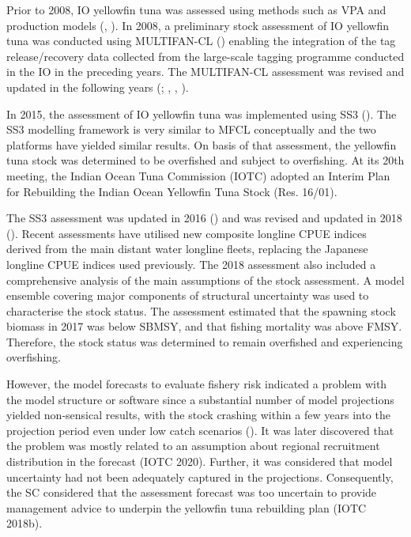 \documentclass[
]{scrartcl}
\begin{document}
Prior to 2008, IO yellowfin tuna was assessed using methods such as VPA
and production models
(, ). In
2008, a preliminary stock assessment of IO yellowfin tuna was conducted
using MULTIFAN-CL
() enabling the integration of the tag release/recovery data
collected from the large-scale tagging programme conducted in the IO in
the preceding years. The MULTIFAN-CL assessment was revised and updated
in the following years
(; ,
,
).

In 2015, the assessment of IO yellowfin tuna was implemented using SS3
(). The
SS3 modelling framework is very similar to MFCL conceptually and the two
platforms have yielded similar results. On basis of that assessment, the
yellowfin tuna stock was determined to be overfished and subject to
overfishing. At its 20th meeting, the Indian Ocean Tuna Commission
(IOTC) adopted an Interim Plan for Rebuilding the Indian Ocean Yellowfin
Tuna Stock (Res. 16/01).

The SS3 assessment was updated in 2016
() and was
revised and updated in 2018
(). Recent
assessments have utilised new composite longline CPUE indices derived
from the main distant water longline fleets, replacing the Japanese
longline CPUE indices used previously. The 2018 assessment also included
a comprehensive analysis of the main assumptions of the stock
assessment. A model ensemble covering major components of structural
uncertainty was used to characterise the stock status. The assessment
estimated that the spawning stock biomass in 2017 was below SBMSY, and
that fishing mortality was above FMSY. Therefore, the stock status was
determined to remain overfished and experiencing overfishing.

However, the model forecasts to evaluate fishery risk indicated a
problem with the model structure or software since a substantial number
of model projections yielded non-sensical results, with the stock
crashing within a few years into the projection period even under low
catch scenarios (). It was later discovered that the problem was mostly related to
an assumption about regional recruitment distribution in the forecast
(IOTC 2020). Further, it was considered that model uncertainty had not
been adequately captured in the projections. Consequently, the SC
considered that the assessment forecast was too uncertain to provide
management advice to underpin the yellowfin tuna rebuilding plan (IOTC
2018b).
\end{document}
